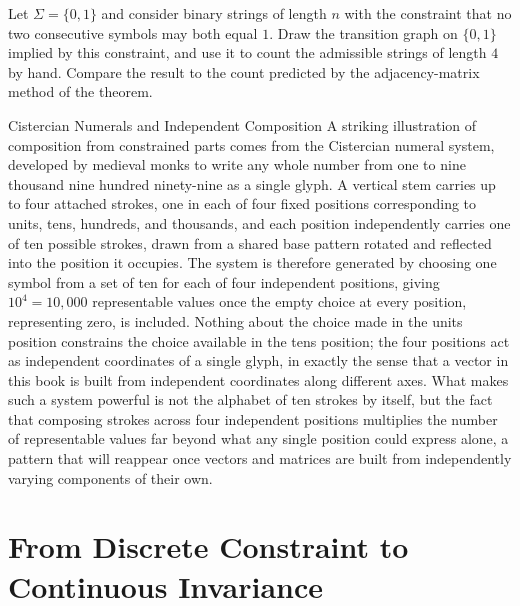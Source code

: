 \begin{practicenow}
Let $\Sigma = \{0,1\}$ and consider binary strings of length $n$ with the
constraint that no two consecutive symbols may both equal $1$. Draw the
transition graph on $\{0,1\}$ implied by this constraint, and use it to count
the admissible strings of length $4$ by hand. Compare the result to the
count predicted by the adjacency-matrix method of the theorem.
\end{practicenow}

\begin{sidebar}{Cistercian Numerals and Independent Composition}
A striking illustration of composition from constrained parts comes from
the Cistercian numeral system, developed by medieval monks to write any
whole number from one to nine thousand nine hundred ninety-nine as a
single glyph. A vertical stem carries up to four attached strokes, one in
each of four fixed positions corresponding to units, tens, hundreds, and
thousands, and each position independently carries one of ten possible
strokes, drawn from a shared base pattern rotated and reflected into the
position it occupies. The system is therefore generated by choosing one
symbol from a set of ten for each of four independent positions, giving
$10^4 = 10{,}000$ representable values once the empty choice at every
position, representing zero, is included. Nothing about the choice made in
the units position constrains the choice available in the tens position;
the four positions act as independent coordinates of a single glyph, in
exactly the sense that a vector in this book is built from independent
coordinates along different axes. What makes such a system powerful is
not the alphabet of ten strokes by itself, but the fact that composing
strokes across four independent positions multiplies the number of
representable values far beyond what any single position could express
alone, a pattern that will reappear once vectors and matrices are built
from independently varying components of their own.
\end{sidebar}

\section{From Discrete Constraint to Continuous Invariance}

